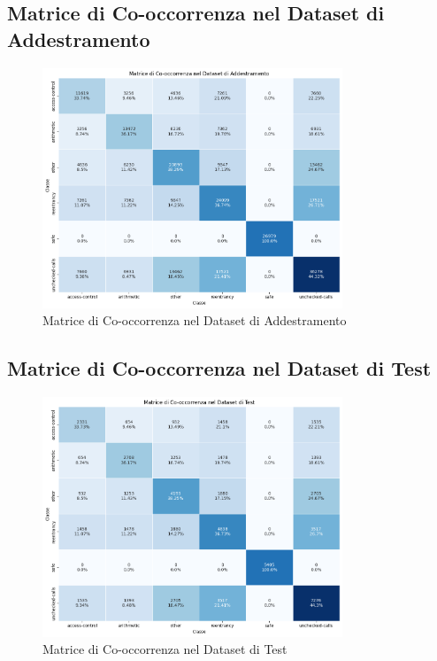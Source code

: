 \documentclass[../../Thesis.tex]{subfiles}
\begin{document}
\subsection{Matrice di Co-occorrenza nel Dataset di Addestramento}
\begin{figure}[H]
    \centering
    \includegraphics[width=0.8\textwidth]{../../img/TrainCo-occurrency.png}
    \caption{Matrice di Co-occorrenza nel Dataset di Addestramento}
    \label{fig:train_cooccurrence_matrix}
\end{figure}

\subsection{Matrice di Co-occorrenza nel Dataset di Test}
\begin{figure}[H]
    \centering
    \includegraphics[width=0.8\textwidth]{../../img/TestCo-occurrency.png}
    \caption{Matrice di Co-occorrenza nel Dataset di Test}
    \label{fig:test_cooccurrence_matrix}
\end{figure}
\end{document}
